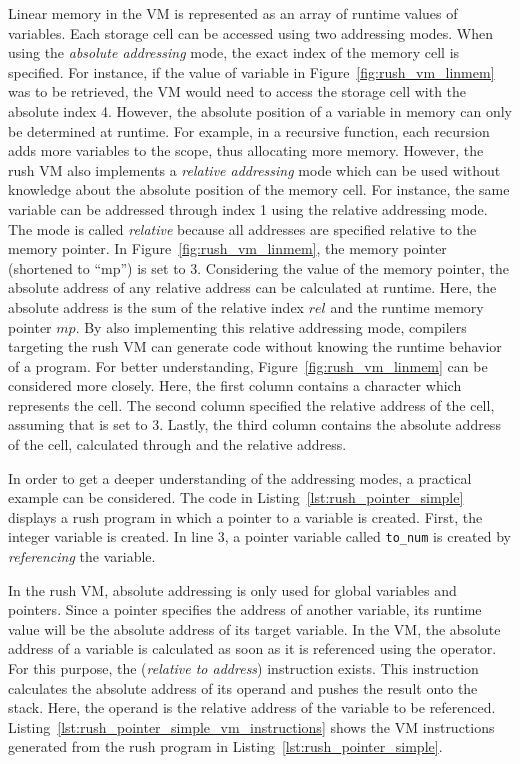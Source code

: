 Linear memory in the VM is represented as an array of runtime values of variables.
Each storage cell can be accessed using two addressing modes.
When using the \emph{absolute addressing} mode, the exact index of the memory cell is specified.
For instance, if the value of variable  in Figure~\ref{fig:rush_vm_linmem} was to be retrieved,
the VM would need to access the storage cell with the absolute index 4.
However, the absolute position of a variable in memory can only be determined at runtime.
For example, in a recursive function, each recursion adds more variables to the scope, thus allocating more memory.
However, the rush VM also implements a \emph{relative addressing} mode which can be used without knowledge about the absolute position of the memory cell.
For instance, the same variable can be addressed through index 1 using the relative addressing mode.
The mode is called \emph{relative} because all addresses are specified relative to the memory pointer.
In Figure~\ref{fig:rush_vm_linmem}, the memory pointer (shortened to \enquote{mp}) is set to 3.
Considering the value of the memory pointer, the absolute address of any relative address can be calculated at runtime.
Here, the absolute address is the sum of the relative index $rel$ and the runtime memory pointer $mp$.
By also implementing this relative addressing mode,
compilers targeting the rush VM can generate code without knowing the runtime behavior of a program.
For better understanding, Figure~\ref{fig:rush_vm_linmem} can be considered more closely.
Here, the first column contains a character which represents the cell.
The second column specified the relative address of the cell, assuming that  is set to 3.
Lastly, the third column contains the absolute address of the cell, calculated through  and the relative address.

In order to get a deeper understanding of the addressing modes, a practical example can be considered.
The code in Listing~\ref{lst:rush_pointer_simple} displays a rush program in which a pointer to a variable is created.
First, the integer variable  is created.
In line 3, a pointer variable called \texttt{to\_num} is created by \emph{referencing} the  variable.


In the rush VM, absolute addressing is only used for global variables and pointers.
Since a pointer specifies the address of another variable, its runtime value will be the absolute address of its target variable.
In the VM, the absolute address of a variable is calculated as soon as it is referenced using the \qVerb{&} operator.
For this purpose, the  (\emph{relative to address}) instruction exists.
This instruction calculates the absolute address of its operand and pushes the result onto the stack.
Here, the operand is the relative address of the variable to be referenced.
Listing~\ref{lst:rush_pointer_simple_vm_instructions} shows the VM instructions generated from the rush program in Listing~\ref{lst:rush_pointer_simple}.

